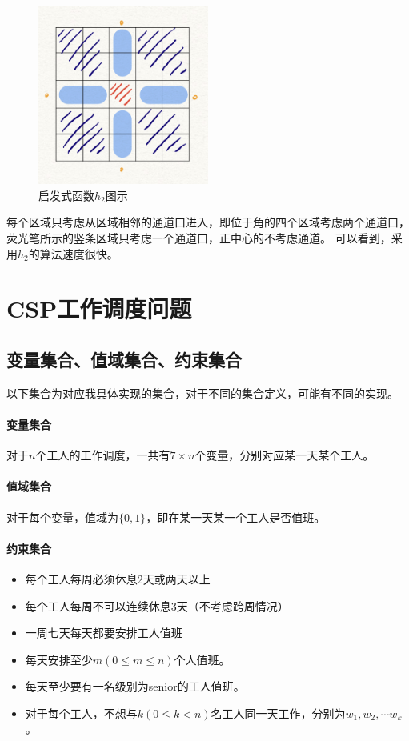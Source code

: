 \documentclass[UTF8]{article}
\begin{document}
\begin{enumerate}[label=\roman*.]
\begin{figure}[H]
            \centering
            \includegraphics[width=0.5\textwidth]{./figs/h2_illustration.jpg}
            \caption{启发式函数$h_2$图示}
        \end{figure}
        每个区域只考虑从区域相邻的通道口进入，即位于角的四个区域考虑两个通道口，
        荧光笔所示的竖条区域只考虑一个通道口，正中心的不考虑通道。
        可以看到，采用$h_2$的算法速度很快。
    \end{enumerate}

    \section{CSP工作调度问题}
    \subsection{变量集合、值域集合、约束集合}
    以下集合为对应我具体实现的集合，对于不同的集合定义，可能有不同的实现。
    \paragraph{变量集合}
    对于$n$个工人的工作调度，一共有$7\times n$个变量，分别对应某一天某个工人。
    \paragraph{值域集合}
    对于每个变量，值域为$\{0, 1\}$，即在某一天某一个工人是否值班。
    \paragraph{约束集合}
    \begin{itemize}
        \item 每个工人每周必须休息2天或两天以上
        \item 每个工人每周不可以连续休息3天（不考虑跨周情况）
        \item 一周七天每天都要安排工人值班
        \item 每天安排至少$m(0 \leq m \leq n)$个人值班。
        \item 每天至少要有一名级别为senior的工人值班。
        \item 对于每个工人，不想与$k(0 \leq k < n)$名工人同一天工作，分别为$w_1, w_2, \cdots w_k$。
    \end{itemize}
\end{document}

